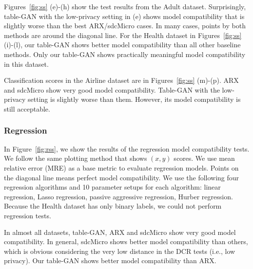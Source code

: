 Figures~\ref{fig:ss} (e)-(h) show the test results from the Adult dataset. Surprisingly, table-GAN with the low-privacy setting in (e) shows model compatibility that is slightly worse than the best ARX\slash sdcMicro cases. In many cases, points by both methods are around the diagonal line. For the Health dataset in Figures~\ref{fig:ss} (i)-(l), our table-GAN shows better model compatibility than all other baseline methods. Only our table-GAN shows practically meaningful model compatibility in this dataset.

Classification scores in the Airline dataset are in Figures~\ref{fig:ss} (m)-(p). ARX and sdcMicro show very good model compatibility. Table-GAN with the low-privacy setting is slightly worse than them. However, its model compatibility is still acceptable.


\subsubsection{Regression}

In Figure~\ref{fig:rss}, we show the results of the regression model compatibility tests. We follow the same plotting method that shows $(x,y)$ scores. We use mean relative error (MRE) as a base metric to evaluate regression models. Points on the diagonal line means perfect model compatibility. We use the following four regression algorithms and 10 parameter setups for each algorithm: linear regression, Lasso regression, passive aggressive regression, Hurber regression. Because the Health dataset has only binary labels, we could not perform regression tests.

In almost all datasets, table-GAN, ARX and sdcMicro show very good model compatibility. In general, sdcMicro shows better model compatibility than others, which is obvious considering the very low distance in the DCR tests (i.e., low privacy). Our table-GAN shows better model compatibility than ARX.





